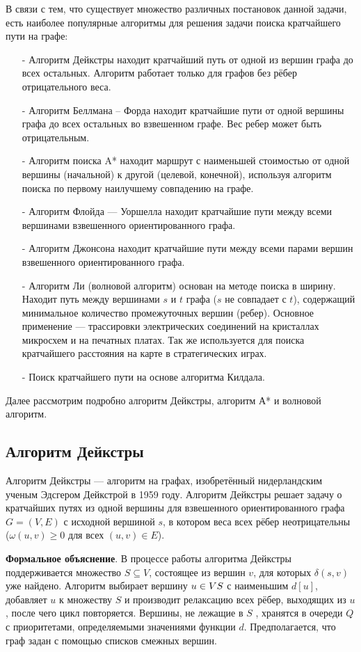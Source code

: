 В связи с тем, что существует множество различных постановок данной задачи, есть наиболее популярные алгоритмы для решения задачи поиска кратчайшего пути на графе:
\begin{itemize}
 \item [-] Алгоритм Дейкстры находит кратчайший путь от одной из вершин графа до всех остальных. 
 Алгоритм работает только для графов без рёбер отрицательного веса.
 \item [-] Алгоритм Беллмана -- Форда находит кратчайшие пути от одной вершины графа до всех остальных во взвешенном графе. 
 Вес ребер может быть отрицательным.
 \item [-] Алгоритм поиска A* находит маршрут с наименьшей стоимостью от одной вершины (начальной) к другой (целевой, конечной), используя алгоритм поиска по первому наилучшему совпадению на графе.
 \item [-] Алгоритм Флойда --- Уоршелла находит кратчайшие пути между всеми вершинами взвешенного ориентированного графа.
 \item [-] Алгоритм Джонсона находит кратчайшие пути между всеми парами вершин взвешенного ориентированного графа.
 \item [-] Алгоритм Ли (волновой алгоритм) основан на методе поиска в ширину. 
 Находит путь между вершинами $s$ и $t$ графа ($s$ не совпадает с $t$), содержащий минимальное количество промежуточных вершин (ребер). 
 Основное применение --- трассировки электрических соединений на кристаллах микросхем и на печатных платах. 
 Так же используется для поиска кратчайшего расстояния на карте в стратегических играх.
 \item [-] Поиск кратчайшего пути на основе алгоритма Килдала.
\end{itemize}

Далее рассмотрим подробно алгоритм Дейкстры, алгоритм А* и волновой алгоритм. 

\subsection{Алгоритм Дейкстры}

Алгоритм Дейкстры --- алгоритм на графах, изобретённый нидерландским ученым Эдсгером Дейкстрой в 1959 году. Алгоритм Дейкстры решает задачу о кратчайших путях из одной вершины для взвешенного ориентированного графа $G = (V, E)$ с исходной вершиной $s$, в котором веса всех рёбер неотрицательны ($\omega(u, v) \geqslant 0$ для всех $(u, v) \in E$).

\textbf{Формальное объяснение}.
В процессе работы алгоритма Дейкстры поддерживается множество $S\subseteq V$, состоящее из вершин $v$, для которых $\delta(s, v)$ уже найдено. 
Алгоритм выбирает вершину $u \in V\\S$ с наименьшим $d[u]$, добавляет $u$ к множеству $S$ и производит релаксацию всех рёбер, выходящих из $u$, после чего цикл повторяется. 
Вершины, не лежащие в $S$ , хранятся в очереди $Q$ с приоритетами, определяемыми значениями функции $d$. Предполагается, что граф задан с помощью списков смежных вершин.

